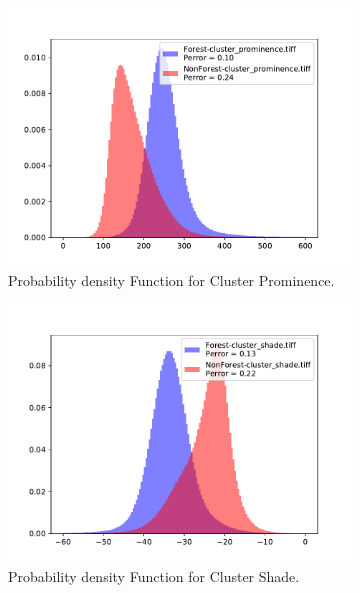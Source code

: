 \begin{figure}[H]
  \centering
  \begin{subfigure}[b]{0.4\linewidth}
    \includegraphics[width=\linewidth]{Chapter5/SENTINEL1/Sigma0/cluster_prominence_histogram.pdf}
     \caption{Probability density Function for Cluster Prominence.}
  \end{subfigure}
  \centering
  \begin{subfigure}[b]{0.4\linewidth}
    \includegraphics[width=\linewidth]{Chapter5/SENTINEL1/Sigma0/cluster_shade_histogram.pdf}
     \caption{Probability density Function for Cluster Shade.}
  \end{subfigure}
  \centering
  \begin{subfigure}[b]{0.4\linewidth}

\end{subfigure}
\end{figure}
